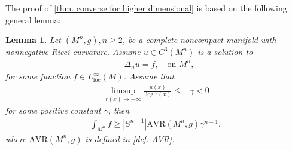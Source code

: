 \documentclass[12pt]{amsart}
\theoremstyle{plain}
\newtheorem{lemma}[theorem]{Lemma}
\theoremstyle{definition}
\theoremstyle{remark}     %
\begin{document}
The proof of \cref{thm. converse for higher dimensional} is based on the following general lemma:
\begin{lemma}\label{lem. lower bound of L1 norm}
    Let $(M^n,g), n\geq 2$, be a complete noncompact manifold with nonnegative Ricci curvature. Assume $u\in C^3(M^n)$ is a solution to
    \begin{align*}
        -\Delta_n u=f,\quad
        \text{on }M^n,
    \end{align*}
    for some function $f\in L^{\infty}_{\text{loc}}(M)$.
    Assume that
    \begin{align}\label{limsup assumption}
        \limsup_{r(x)\to+\infty}
        \frac{u(x)}{\log r(x)}
        \leq -\gamma<0
    \end{align}
    for some positive constant $\gamma$, then
    \begin{align*}
        \int_{M^n}f
        \geq |\mathbb{S}^{n-1}|
        \mathrm{AVR}(M^n,g)\gamma^{n-1},
    \end{align*}
    where $\mathrm{AVR}(M^n,g)$ is defined in \cref{def. AVR}.
\end{lemma}
\end{document}
